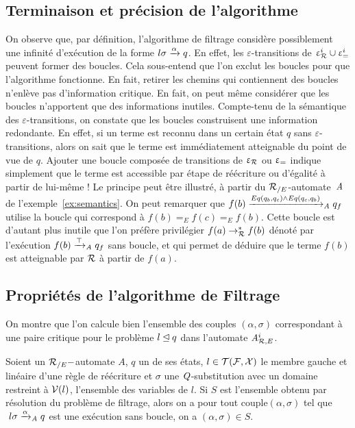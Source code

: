 \subsection{Terminaison et précision de l'algorithme}

On observe que, par définition, l'algorithme de filtrage considère possiblement
une infinité d'exécution de la forme $l\sigma \xrightarrow{\alpha} q$.
En effet, les $\varepsilon$-transitions de $\upvarepsilon_{\mathcal R}^i \cup \upvarepsilon_{=}^i$ peuvent former des boucles. 
Cela sous-entend que l'on exclut les boucles pour que l'algorithme fonctionne.
En fait, retirer les chemins qui contiennent des boucles n'enlève pas d'information
critique. En fait, on peut même considérer que les boucles n'apportent que des
informations inutiles. Compte-tenu de la sémantique des $\varepsilon$-transitions, 
on constate que les boucles construisent une information redondante. En effet, si un
terme est reconnu dans un certain état $q$ sans $\varepsilon$-transitions, alors on sait
que le terme est immédiatement atteignable du point de vue de $q$. Ajouter une boucle composée
de transitions de $\upvarepsilon_{\mathcal R}$ ou $\upvarepsilon_{=}$ indique simplement que le terme est accessible par étape de 
réécriture ou d'égalité à partir de lui-même ! Le principe peut être illustré, à partir du ${\mathcal R_{/E}}$-automate~$\mathit A$
de l'exemple~\ref{ex:semantics}. On peut remarquer que $f(b) \xrightarrow{Eq(q_b, q_c)
  \land Eq(q_c, q_b)}_\mathit A q_f$ utilise la boucle qui correspond à $f(b) =_E f(c) =_E f(b)$. 
Cette boucle est d'autant plus inutile que l'on préfère privilégier $f(a) \rightarrow_\mathcal R^* f(b)$ 
dénoté par l'exécution $f(b) \xrightarrow{\top}_\mathit A q_f$ sans boucle, et qui permet de déduire que le terme $f(b)$
est atteignable par $\mathcal R$ à partir de $f(a)$.

\subsection{Propriétés de l'algorithme de Filtrage}

On montre que l'on calcule bien l'ensemble des couples $(\alpha,\sigma)$
correspondant à une paire critique pour le problème $l \unlhd q$ dans l'automate ${\mathit A}_{\mathcal R,E}^i$.

\begin{property}
  \label{prop:matching-complete}
  Soient un ${\mathcal R_{/E}}-$automate $A$, $q$ un de ses états, $l \in \mathcal{T(F, X)}$ le
  membre gauche et linéaire d'une règle de réécriture et $\sigma$ une
  $\mathit Q$-substitution avec un domaine restreint à $\mathcal V(l)$, l'ensemble des variables de $l$.
  Si $S$ est l'ensemble obtenu par résolution du problème de filtrage, alors on a pour
  tout couple$(\alpha, \sigma)$ tel que $\ l\sigma \xrightarrow{\alpha}_\mathit A q$ est une
  exécution sans boucle, on a $(\alpha, \sigma) \in S$.
\end{property}

